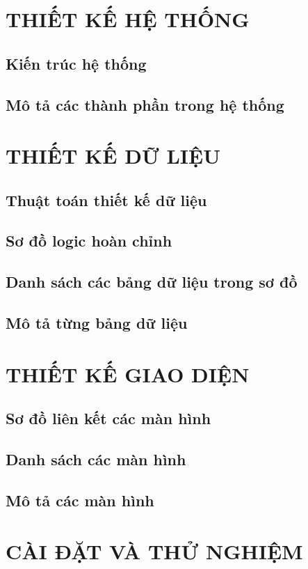 \documentclass[a4paper]{article}
\begin{document}
							
		

\section{THIẾT KẾ HỆ THỐNG}
	\subsection{Kiến trúc hệ thống}
	\subsection{Mô tả các thành phần trong hệ thống}

\section{THIẾT KẾ DỮ LIỆU}
	\subsection{Thuật toán thiết kế dữ liệu}
	\subsection{Sơ đồ logic hoàn chỉnh}
	\subsection{Danh sách các bảng dữ liệu trong sơ đồ}
	\subsection{Mô tả từng bảng dữ liệu}

\section{THIẾT KẾ GIAO DIỆN}
	\subsection{Sơ đồ liên kết các màn hình}
	\subsection{Danh sách các màn hình}
	\subsection{Mô tả các màn hình}

\section{CÀI ĐẶT VÀ THỬ NGHIỆM}
\end{document}

